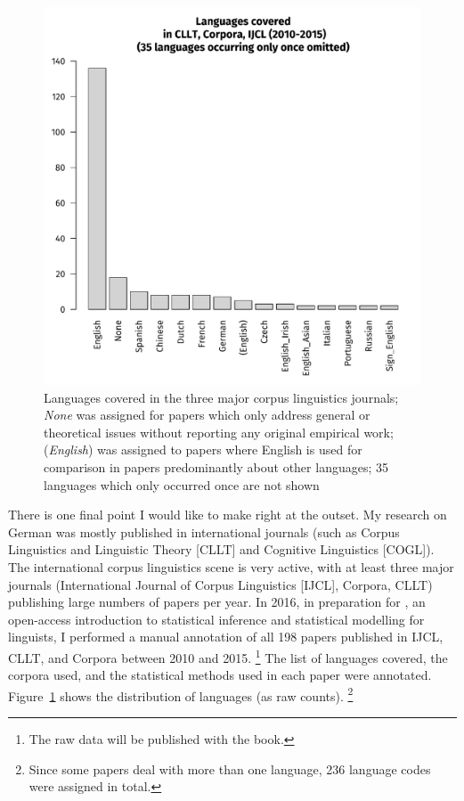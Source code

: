 \documentclass[a4paper, biblatex, charis, linguex]{glossa}
\begin{document}
\begin{figure}[htpb]
  \centering
  \includegraphics[width=\textwidth]{graphics/langsuse}
  \caption{Languages covered in the three major corpus linguistics journals; \textit{None} was assigned for papers which only address general or theoretical issues without reporting any original empirical work; (\textit{English}) was assigned to papers where English is used for comparison in papers predominantly about other languages; 35 languages which only occurred once are not shown}
  \label{fig:langsuse}
\end{figure}

There is one final point I would like to make right at the outset.\label{abs:survey}
My research on German was mostly published in international journals (such as Corpus Linguistics and Linguistic Theory [CLLT] and Cognitive Linguistics [COGL]).
The international corpus linguistics scene is very active, with at least three major journals (International Journal of Corpus Linguistics [IJCL], Corpora, CLLT) publishing large numbers of papers per year.
In 2016, in preparation for \citet{Schaefer2019}, an open-access introduction to statistical inference and statistical modelling for linguists, I performed a manual annotation of all 198 papers published in IJCL, CLLT, and Corpora between 2010 and 2015.%
\footnote{The raw data will be published with the book.}
The list of languages covered, the corpora used, and the statistical methods used in each paper were annotated.
Figure~\ref{fig:langsuse} shows the distribution of languages (as raw counts).%
\footnote{Since some papers deal with more than one language, 236 language codes were assigned in total.}
\end{document}
